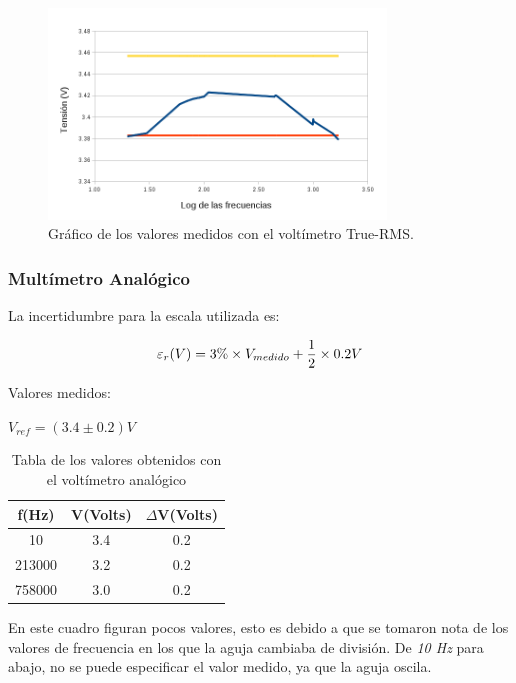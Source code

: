 \documentclass{article}
\begin{document}
\begin{figure}[h]
\centering
\includegraphics[width=0.80\textwidth]{images/tablaTRUE.png}
\caption{Gráfico de los valores medidos con el voltímetro True-RMS.}
\end{figure}
\bigskip
\bigskip

\subsubsection{Multímetro Analógico}


La incertidumbre para la escala utilizada es:

\begin{equation}
 	\varepsilon_r(V) = 3\%\times V_{medido} + {1 \over 2}\times 0.2V
\end{equation}
\medskip

Valores medidos:

\begin{center}
$V_{ref} = (3.4 \pm 0.2) V$
\end{center}

\begin{table}[!hbt]
	\begin{center}
	\begin{tabular}{|c|c|c|}\hline
	\textbf{f(Hz)} & \textbf{V(Volts)} & \textbf{$\Delta$V(Volts)} \\ \hline
	10 & 3.4 & 0.2\\ \hline
    213000 & 3.2 & 0.2\\ \hline
    758000 & 3.0 & 0.2\\ \hline
	\end{tabular}
	\caption{Tabla de los valores obtenidos con el voltímetro analógico}
	\end{center}
\end{table}
\bigskip

En este cuadro figuran pocos valores, esto es debido a que se tomaron nota de los valores de frecuencia en los que la aguja cambiaba de división. De \textit{10 Hz} para abajo, no se puede especificar el valor medido, ya que la aguja oscila.
\end{document}
